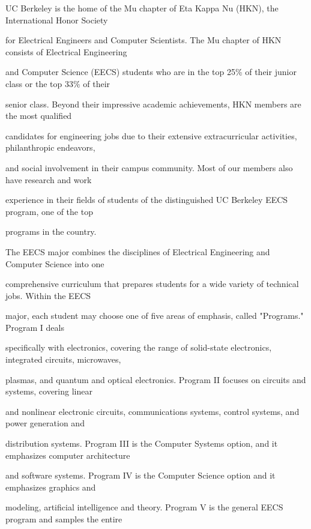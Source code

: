 \documentclass[11pt]{article}
\begin{document}


UC Berkeley is the home of the Mu chapter of Eta Kappa Nu (HKN), the International Honor Society

for Electrical Engineers and Computer Scientists. The Mu chapter of HKN consists of Electrical Engineering

and Computer Science (EECS) students who are in the top 25\% of their junior class or the top 33\% of their

senior class. Beyond their impressive academic achievements, HKN members are the most qualified

candidates for engineering jobs due to their extensive extracurricular activities, philanthropic endeavors,

and social involvement in their campus community. Most of our members also have research and work

experience in their fields of students of the distinguished UC Berkeley EECS program, one of the top

programs in the country.



The EECS major combines the disciplines of Electrical Engineering and Computer Science into one

comprehensive curriculum that prepares students for a wide variety of technical jobs. Within the EECS

major, each student may choose one of five areas of emphasis, called "Programs." Program I deals

specifically with electronics, covering the range of solid-state electronics, integrated circuits, microwaves,

plasmas, and quantum and optical electronics. Program II focuses on circuits and systems, covering linear

and nonlinear electronic circuits, communications systems, control systems, and power generation and

distribution systems. Program III is the Computer Systems option, and it emphasizes computer architecture

and software systems. Program IV is the Computer Science option and it emphasizes graphics and

modeling, artificial intelligence and theory. Program V is the general EECS program and samples the entire
\end{document}
